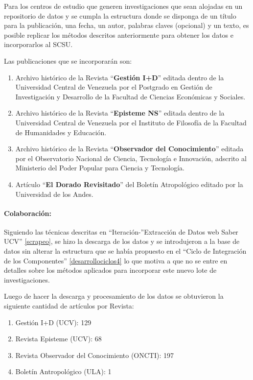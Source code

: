 \documentclass[
  12pt,
  openany]{book}
\begin{document}
Para los centros de estudio que generen investigaciones que sean alojadas en un repositorio de datos y se cumpla la estructura donde se disponga de un título para la publicación, una fecha, un autor, palabras claves (opcional) y un texto, es posible replicar los métodos descritos anteriormente para obtener los datos e incorporarlos al SCSU.

Las publicaciones que se incorporarán son:

\begin{enumerate}
\def\labelenumi{\arabic{enumi}.}
\item
  Archivo histórico de la Revista ``\textbf{Gestión I+D}'' editada dentro de la Universidad Central de Venezuela por el Postgrado en Gestión de Investigación y Desarrollo de la Facultad de Ciencias Económicas y Sociales.
\item
  Archivo histórico de la Revista ``\textbf{Episteme NS}'' editada dentro de la Universidad Central de Venezuela por el Instituto de Filosofía de la Facultad de Humanidades y Educación.
\item
  Archivo histórico de la Revista ``\textbf{Observador del Conocimiento}'' editada por el Observatorio Nacional de Ciencia, Tecnología e Innovación, adscrito al Ministerio del Poder Popular para Ciencia y Tecnología.
\item
  Artículo ``\textbf{El Dorado Revisitado}'' del Boletín Atropológico editado por la Universidad de los Andes.
\end{enumerate}

\hypertarget{dcseiscola}{%
\paragraph{Colaboración:}\label{dcseiscola}}

Siguiendo las técnicas descritas en ``Iteración-''Extracción de Datos web Saber UCV'' \ref{scrapeo}, se hizo la descarga de los datos y se introdujeron a la base de datos sin alterar la estructura que se había propuesto en el ``Ciclo de Integración de los Componentes'' \ref{desarrollociclos4} lo que motiva a que no se entre en detalles sobre los métodos aplicados para incorporar este nuevo lote de investigaciones.

Luego de hacer la descarga y procesamiento de los datos se obtuvieron la siguiente cantidad de artículos por Revista:

\begin{enumerate}
\def\labelenumi{\arabic{enumi}.}
\item
  Gestión I+D (UCV): 129
\item
  Revista Episteme (UCV): 68
\item
  Revista Observador del Conocimiento (ONCTI): 197
\item
  Boletín Antropológico (ULA): 1
\end{enumerate}
\end{document}
